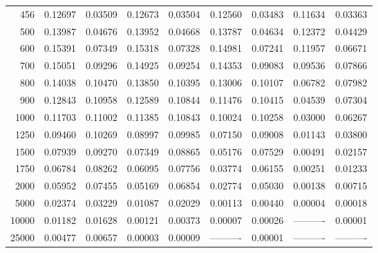 \begin{table}[ht]
\begin{tabular}{r|c|c|c|c|c|c|c|c}
      456 & 0.12697 & 0.03509 & 0.12673 & 0.03504 & 0.12560 & 0.03483 & 0.11634 & 0.03363 \\
      500 & 0.13987 & 0.04676 & 0.13952 & 0.04668 & 0.13787 & 0.04634 & 0.12372 & 0.04429 \\
      600 & 0.15391 & 0.07349 & 0.15318 & 0.07328 & 0.14981 & 0.07241 & 0.11957 & 0.06671 \\
      700 & 0.15051 & 0.09296 & 0.14925 & 0.09254 & 0.14353 & 0.09083 & 0.09536 & 0.07866 \\
      800 & 0.14038 & 0.10470 & 0.13850 & 0.10395 & 0.13006 & 0.10107 & 0.06782 & 0.07982 \\
      900 & 0.12843 & 0.10958 & 0.12589 & 0.10844 & 0.11476 & 0.10415 & 0.04539 & 0.07304 \\
     1000 & 0.11703 & 0.11002 & 0.11385 & 0.10843 & 0.10024 & 0.10258 & 0.03000 & 0.06267 \\
     1250 & 0.09460 & 0.10269 & 0.08997 & 0.09985 & 0.07150 & 0.09008 & 0.01143 & 0.03800 \\
     1500 & 0.07939 & 0.09270 & 0.07349 & 0.08865 & 0.05176 & 0.07529 & 0.00491 & 0.02157 \\
     1750 & 0.06784 & 0.08262 & 0.06095 & 0.07756 & 0.03774 & 0.06155 & 0.00251 & 0.01233 \\
     2000 & 0.05952 & 0.07455 & 0.05169 & 0.06854 & 0.02774 & 0.05030 & 0.00138 & 0.00715 \\
     5000 & 0.02374 & 0.03229 & 0.01087 & 0.02029 & 0.00113 & 0.00440 & 0.00004 & 0.00018 \\
    10000 & 0.01182 & 0.01628 & 0.00121 & 0.00373 & 0.00007 & 0.00026 & ---------- & 0.00001 \\
    25000 & 0.00477 & 0.00657 & 0.00003 & 0.00009 & ---------- & 0.00001 & ---------- & ---------- \\ \cline{1-9}
    \end{tabular}
    \label{tab:XRayEffOCX1}
\end{table}
